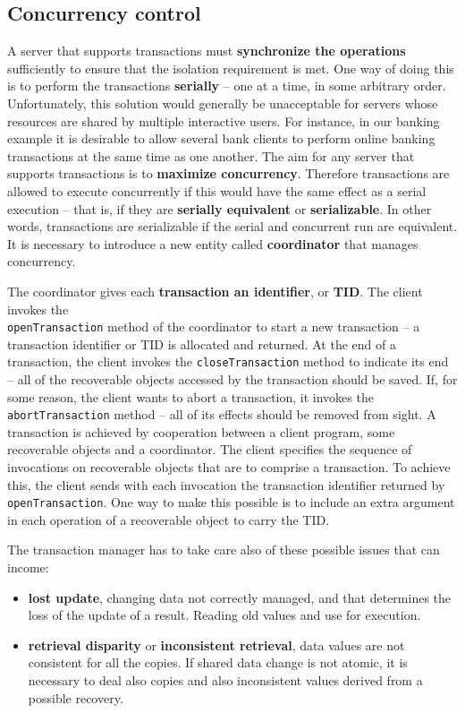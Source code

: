 \subsection{Concurrency control}
A server that supports transactions must \textbf{synchronize the operations} sufficiently to
ensure that the isolation requirement is met. One way of doing this is to perform the
transactions \textbf{serially} – one at a time, in some arbitrary order. Unfortunately, this solution would generally be unacceptable for servers whose resources are shared by multiple interactive users. For instance, in our banking example it is desirable to allow several bank clients to perform online banking transactions at the same time as one another. The aim for any server that supports transactions is to \textbf{maximize concurrency}.
Therefore transactions are allowed to execute concurrently if this would have the same effect as a serial execution – that is, if they are \textbf{serially equivalent} or \textbf{serializable}. In other words, transactions are serializable if the serial and concurrent run are equivalent. It is necessary to introduce a new entity called \textbf{coordinator} that manages concurrency.


The coordinator gives each \textbf{transaction an identifier}, or \textbf{TID}. The client invokes the\\ \verb!openTransaction! method of the coordinator to start a new transaction – a transaction identifier or TID is allocated and returned. At the end of a transaction, the client invokes the \verb!closeTransaction! method to indicate its end – all of the recoverable objects accessed by the transaction should be saved. If, for some reason, the client wants to abort a transaction, it invokes the \verb!abortTransaction! method – all of its effects should be removed from sight. A transaction is achieved by cooperation between a client program, some recoverable objects and a coordinator. The client specifies the sequence of invocations on recoverable objects that are to comprise a transaction. To achieve this, the client sends with each invocation the transaction identifier returned by \verb!openTransaction!. One way to make this possible is to include an extra argument in each operation of a recoverable object to carry the TID.

The transaction manager has to take care also of these possible issues that can income:
\begin{itemize}
	\item \textbf{lost update}, changing data not correctly managed, and that determines the loss of the update of a result. Reading old values and use for execution.
	
	\item \textbf{retrieval disparity} or \textbf{inconsistent retrieval}, data values are not 	consistent for all the copies. If shared data change is not atomic, it is necessary to deal also copies and also inconsistent values derived from a possible recovery.
\end{itemize}

